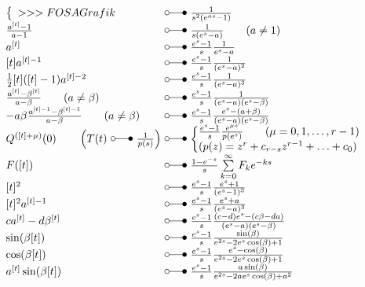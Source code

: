 \[ \begin{array}{@{}l@{ ~ \laplace ~ }l@{}}
\left\lbrace\begin{array}{l}
>>>FOSA Grafik \\
\end{array}\right. &
    \frac{1}{s^2 (e^{as} - 1)} \\
\frac{a^{[t]} - 1}{a - 1} &
    \frac{1}{s (e^s - a)} \qquad (a \neq 1) \\
a^{[t]} &
    \frac{e^s - 1}{s} \frac{1}{e^s - a} \\
\lbrack t \rbrack a^{[t] - 1} &
    \frac{e^s - 1}{s} \frac{1}{(e^s - a)^2} \\
\frac{1}{2} [t] ([t] - 1) a^{[t] - 2} &
    \frac{e^s - 1}{s} \frac{1}{(e^s - a)^3} \\
\frac{a^{[t]} - \beta^{[t]}}{a - \beta} \qquad (a \neq \beta) &
    \frac{e^s - 1}{s} \frac{1}{(e^s - a) (e^s - \beta)} \\
- a \beta \frac{a^{[t] - 1} - \beta^{[t] - 1}}{a - \beta} \qquad (a \neq \beta) &
    \frac{e^s - 1}{s} \frac{e^s - (a + \beta)}{(e^s - a) (e^s - \beta)} \\
Q^{([t] + \mu)} (0) \qquad \left(T(t) ~ \laplace ~ \frac{1}{p(s)}\right) &
    \left\lbrace\begin{array}{@{}l@{}}
    \frac{e^s - 1}{s} \frac{e^{\mu s}}{p(e^s)} \qquad (\mu = 0, 1, \ldots, r - 1) \\
    (p(z) = z^r + c_{r - s} z^{r - 1} + \ldots + c_0) \\
    \end{array}\right. \\
F([t]) &
    \frac{1 - e^{-s}}{s} \sum\limits_{k=0}^{\infty} F_k e^{-ks} \\
{[t]^2} &
    \frac{e^s - 1}{s} \frac{e^s + 1}{(e^s - 1)^3} \\
{[t]^2} a^{[t] - 1} &
    \frac{e^s - 1}{s} \frac{e^s + a}{(e^s - a)^3} \\
c a^{[t]} - d \beta^{[t]} &
    \frac{e^s - 1}{s} \frac{(c - d) e^s - (c \beta - d a)}{(e^s - a) (e^s - \beta)} \\
\sin(\beta[t]) &
    \frac{e^s - 1}{s} \frac{\sin(\beta)}{e^{2s} - 2 e^s \cos(\beta) + 1} \\
\cos(\beta [t]) &
    \frac{e^s - 1}{s} \frac{e^s - \cos(\beta)}{e^{2s} - 2 e^s \cos(\beta) + 1} \\
a^{[t]} \sin(\beta [t]) &
    \frac{e^s - 1}{s} \frac{a \sin(\beta)}{e^{2s} - 2 a e^s \cos(\beta) + a^2} \\

\end{array}\]
